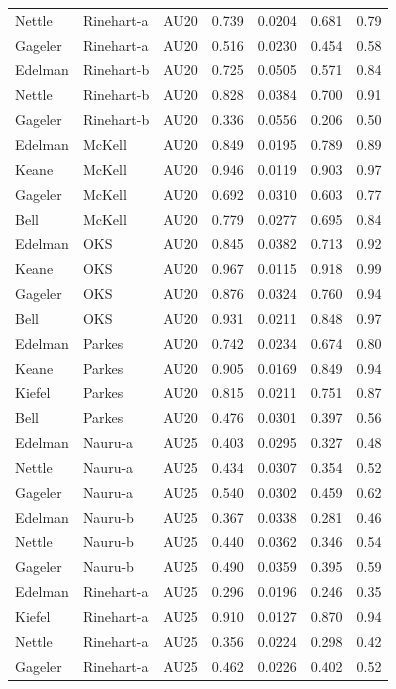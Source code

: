\documentclass{monashthesis}
\begin{document}
\begin{center}
\begin{longtable}{lllllll}
Nettle & Rinehart-a & AU20 & 0.739 & 0.0204 & 0.681 & 0.79 \\
Gageler & Rinehart-a & AU20 & 0.516 & 0.0230 & 0.454 & 0.58 \\
Edelman & Rinehart-b & AU20 & 0.725 & 0.0505 & 0.571 & 0.84 \\
Nettle & Rinehart-b & AU20 & 0.828 & 0.0384 & 0.700 & 0.91 \\
Gageler & Rinehart-b & AU20 & 0.336 & 0.0556 & 0.206 & 0.50 \\
Edelman & McKell & AU20 & 0.849 & 0.0195 & 0.789 & 0.89 \\
Keane & McKell & AU20 & 0.946 & 0.0119 & 0.903 & 0.97 \\
Gageler & McKell & AU20 & 0.692 & 0.0310 & 0.603 & 0.77 \\
Bell & McKell & AU20 & 0.779 & 0.0277 & 0.695 & 0.84 \\
Edelman & OKS & AU20 & 0.845 & 0.0382 & 0.713 & 0.92 \\
Keane & OKS & AU20 & 0.967 & 0.0115 & 0.918 & 0.99 \\
Gageler & OKS & AU20 & 0.876 & 0.0324 & 0.760 & 0.94 \\
Bell & OKS & AU20 & 0.931 & 0.0211 & 0.848 & 0.97 \\
Edelman & Parkes & AU20 & 0.742 & 0.0234 & 0.674 & 0.80 \\
Keane & Parkes & AU20 & 0.905 & 0.0169 & 0.849 & 0.94 \\
Kiefel & Parkes & AU20 & 0.815 & 0.0211 & 0.751 & 0.87 \\
Bell & Parkes & AU20 & 0.476 & 0.0301 & 0.397 & 0.56 \\
Edelman & Nauru-a & AU25 & 0.403 & 0.0295 & 0.327 & 0.48 \\
Nettle & Nauru-a & AU25 & 0.434 & 0.0307 & 0.354 & 0.52 \\
Gageler & Nauru-a & AU25 & 0.540 & 0.0302 & 0.459 & 0.62 \\
Edelman & Nauru-b & AU25 & 0.367 & 0.0338 & 0.281 & 0.46 \\
Nettle & Nauru-b & AU25 & 0.440 & 0.0362 & 0.346 & 0.54 \\
Gageler & Nauru-b & AU25 & 0.490 & 0.0359 & 0.395 & 0.59 \\
Edelman & Rinehart-a & AU25 & 0.296 & 0.0196 & 0.246 & 0.35 \\
Kiefel & Rinehart-a & AU25 & 0.910 & 0.0127 & 0.870 & 0.94 \\
Nettle & Rinehart-a & AU25 & 0.356 & 0.0224 & 0.298 & 0.42 \\
Gageler & Rinehart-a & AU25 & 0.462 & 0.0226 & 0.402 & 0.52 \\

\end{longtable}
\end{center}
\end{document}
